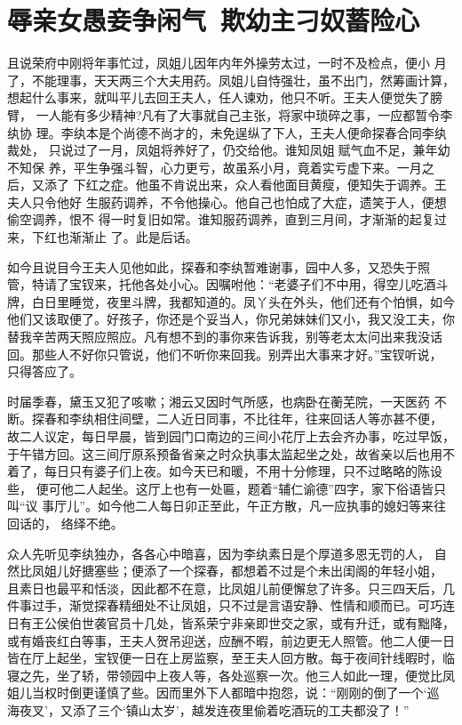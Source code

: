 \chapter{辱亲女愚妾争闲气~欺幼主刁奴蓄险心}

且说荣府中刚将年事忙过，凤姐儿因年内年外操劳太过，一时不及检点，便小
月了，不能理事，天天两三个大夫用药。凤姐儿自恃强壮，虽不出门，然筹画计算，
想起什么事来，就叫平儿去回王夫人，任人谏劝，他只不听。王夫人便觉失了膀臂，
一人能有多少精神?凡有了大事就自己主张，将家中琐碎之事，一应都暂令李纨协
理。李纨本是个尚德不尚才的，未免逞纵了下人，王夫人便命探春合同李纨裁处，
只说过了一月，凤姐将养好了，仍交给他。谁知凤姐赋气血不足，兼年幼不知保
养，平生争强斗智，心力更亏，故虽系小月，竟着实亏虚下来。一月之后，又添了
下红之症。他虽不肯说出来，众人看他面目黄瘦，便知失于调养。王夫人只令他好
生服药调养，不令他操心。他自己也怕成了大症，遗笑于人，便想偷空调养，恨不
得一时复旧如常。谁知服药调养，直到三月间，才渐渐的起复过来，下红也渐渐止
了。此是后话。

如今且说目今王夫人见他如此，探春和李纨暂难谢事，园中人多，又恐失于照
管，特请了宝钗来，托他各处小心。因嘱咐他：“老婆子们不中用，得空儿吃酒斗
牌，白日里睡觉，夜里斗牌，我都知道的。凤丫头在外头，他们还有个怕惧，如今
他们又该取便了。好孩子，你还是个妥当人，你兄弟妹妹们又小，我又没工夫，你
替我辛苦两天照应照应。凡有想不到的事你来告诉我，别等老太太问出来我没话
回。那些人不好你只管说，他们不听你来回我。别弄出大事来才好。”宝钗听说，
只得答应了。

时届季春，黛玉又犯了咳嗽；湘云又因时气所感，也病卧在蘅芜院，一天医药
不断。探春和李纨相住间壁，二人近日同事，不比往年，往来回话人等亦甚不便，
故二人议定，每日早晨，皆到园门口南边的三间小花厅上去会齐办事，吃过早饭，
于午错方回。这三间厅原系预备省亲之时众执事太监起坐之处，故省亲以后也用不
着了，每日只有婆子们上夜。如今天已和暖，不用十分修理，只不过略略的陈设些，
便可他二人起坐。这厅上也有一处匾，题着“辅仁谕德”四字，家下俗语皆只叫“议
事厅儿”。如今他二人每日卯正至此，午正方散，凡一应执事的媳妇等来往回话的，
络绎不绝。

众人先听见李纨独办，各各心中暗喜，因为李纨素日是个厚道多恩无罚的人，
自然比凤姐儿好搪塞些；便添了一个探春，都想着不过是个未出闺阁的年轻小姐，
且素日也最平和恬淡，因此都不在意，比凤姐儿前便懈怠了许多。只三四天后，几
件事过手，渐觉探春精细处不让凤姐，只不过是言语安静、性情和顺而已。可巧连
日有王公侯伯世袭官员十几处，皆系荣宁非亲即世交之家，或有升迁，或有黜降，
或有婚丧红白等事，王夫人贺吊迎送，应酬不暇，前边更无人照管。他二人便一日
皆在厅上起坐，宝钗便一日在上房监察，至王夫人回方散。每于夜间针线暇时，临
寝之先，坐了轿，带领园中上夜人等，各处巡察一次。他三人如此一理，便觉比凤
姐儿当权时倒更谨慎了些。因而里外下人都暗中抱怨，说：“刚刚的倒了一个‘巡
海夜叉’，又添了三个‘镇山太岁’，越发连夜里偷着吃酒玩的工夫都没了！”

